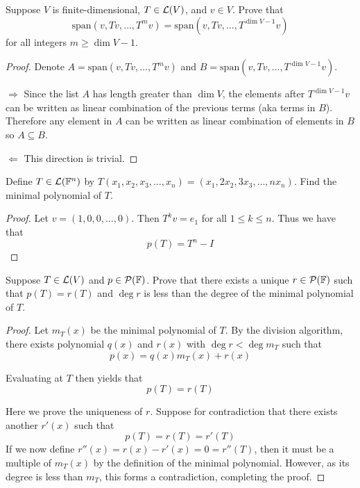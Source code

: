 \documentclass{extarticle}
\begin{document}
\begin{problem}{10}
    Suppose \(V\) is finite-dimensional, \(T \in \mathcal{L}(V)\), and \(v \in V\). Prove that 
    \[\text{span}(v, Tv, \ldots, T^m v) = \text{span}(v, Tv, \ldots, T^{\dim V - 1}v)\]
    for all integers \(m \geq \dim V - 1\).
\end{problem}


\begin{proof}
    Denote \(A = \text{span}(v, Tv, \ldots, T^m v)\) and \(B = \text{span}(v, Tv, \ldots, T^{\dim V - 1}v)\).

\(\Rightarrow\) Since the list \(A\) has length greater than \(\dim V\), the elements after \(T^{\dim V - 1}v\)
can be written as linear combination of the previous terms (aka terms in \(B\)). Therefore any element in \(A\) 
can be written as linear combination of elements in \(B\) so \(A \subseteq B\).

\(\Leftarrow\) This direction is trivial. 
\end{proof}


\begin{problem}{12}
    Define \(T \in \mathcal{L}(\mathbb{F}^n)\) by \(T(x_1, x_2, x_3, \ldots, x_n) = (x_1, 2x_2, 3x_3, \ldots, n x_n)\). 
    Find the minimal polynomial of \(T\).
\end{problem}

\begin{proof}
Let \(v = (1, 0, 0, \ldots, 0)\). Then \(T^k v = e_1\) for all \(1 \leq k \leq n\). Thus we have that 
\[p(T) = T^n - I\]
\end{proof}

\begin{problem}{13}
    Suppose \(T \in \mathcal{L}(V)\) and \(p \in \mathcal{P}(\mathbb{F})\). Prove that there exists a unique \(r \in \mathcal{P}(\mathbb{F})\)
    such that \(p(T) = r(T)\) and \(\deg r\) is less than the degree of the minimal polynomial 
    of \(T\). 
\end{problem}


\begin{proof}
Let \(m_T(x)\) be the minimal polynomial of \(T\). By the division algorithm, there exists polynomial 
\(q(x)\) and \(r(x)\) with \(\deg r < \deg m_T\) such that 
\[p(x) = q(x)m_T(x) + r(x)\]

Evaluating at \(T\) then yields that 
\[p(T) = r(T)\]

Here we prove the uniqueness of \(r\). Suppose for contradiction that there exists another \(r'(x)\) such 
that 
\[p(T) = r(T) = r'(T)\]
If we now define \(r''(x) = r(x) - r'(x) = 0 = r''(T)\), then it must be a multiple of \(m_T(x)\) by the definition 
of the minimal polynomial. However, as its degree is less than \(m_T\), this forms a contradiction, 
completing the proof. 

\end{proof}
\end{document}
